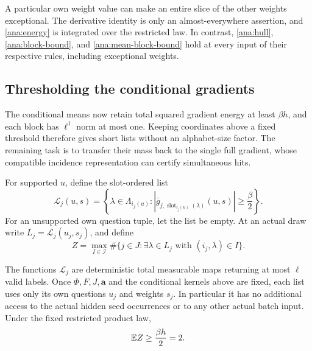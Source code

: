 A particular own weight value can make an entire slice of the other
weights exceptional. The derivative identity is only an
almost-everywhere assertion, and \eqref{ana:energy} is integrated
over the restricted law. In contrast,
\eqref{ana:hull}, \eqref{ana:block-bound}, and
\eqref{ana:mean-block-bound} hold at every input of their respective
rules, including exceptional weights.

\subsection{Thresholding the conditional gradients}

The conditional means now retain total squared gradient energy at
least \(\beta h\), and each block has \(\ell^1\) norm at most one.
Keeping coordinates above a fixed threshold therefore gives short
lists without an alphabet-size factor. The remaining task is to
transfer their mass back to the single full gradient, whose compatible
incidence representation can certify simultaneous hits.

For supported \(u\), define the slot-ordered list
\begin{equation}
 \mathcal L_j(u,s)=
  \left\{\lambda\in\Lambda_{i_j(u)}:
    \left|\bar g_{j,\operatorname{slot}_{i_j(u)}(\lambda)}(u,s)\right|
       \geq\frac\beta2\right\}.
 \label{ana:list-definition}
\end{equation}
For an unsupported own question tuple, let the list be empty.
At an actual draw write \(L_j=\mathcal L_j(u_j,s_j)\), and define
\begin{equation}
 Z=\max_{I\in\mathcal I}
       \#\{j\in J:\exists\lambda\in L_j\text{ with }(i_j,\lambda)\in I\}.
 \label{ana:hit-count}
\end{equation}

\begin{proposition}
\label{ana:lists}
The functions \(\mathcal L_j\) are deterministic total measurable maps
returning at most \(\ell\) valid labels. Once
\(\Phi,F,J,\boldsymbol a\) and the conditional kernels above are
fixed, each list uses only its own questions \(u_j\) and weights
\(s_j\). In particular it has no additional access to the actual
hidden seed occurrences or to any other actual batch input.
Under the fixed restricted product law,
\begin{equation}
 \mathbb E Z\geq\frac{\beta h}{2}=2.
 \label{ana:list-hits}
\end{equation}
\end{proposition}

